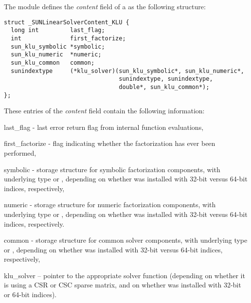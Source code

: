 The {\sunlinsolklu} module defines the \textit{content} field of a
 as the following structure:
\begin{verbatim}
struct _SUNLinearSolverContent_KLU {
  long int         last_flag;
  int              first_factorize;
  sun_klu_symbolic *symbolic;
  sun_klu_numeric  *numeric;
  sun_klu_common   common;
  sunindextype     (*klu_solver)(sun_klu_symbolic*, sun_klu_numeric*,
                                 sunindextype, sunindextype,
                                 double*, sun_klu_common*);
};
\end{verbatim}
These entries of the \emph{content} field contain the following
information:
\begin{args}
  \item[last\_flag] - last error return flag from internal function evaluations,
  \item[first\_factorize] - flag indicating whether the factorization
    has ever been performed,
  \item[symbolic] - {\klu} storage structure for symbolic
    factorization components, with underlying type 
    or , depending on whether {\sundials} was
    installed with 32-bit versus 64-bit indices, respectively,
  \item[numeric] - {\klu} storage structure for numeric factorization
    components, with underlying type  or
    , depending on whether {\sundials} was
    installed with 32-bit versus 64-bit indices, respectively.
  \item[common] - storage structure for common {\klu} solver
    components, with underlying type  or
    , depending on whether {\sundials} was
    installed with 32-bit versus 64-bit indices, respectively,
  \item[klu\_solver] -- pointer to the appropriate {\klu} solver function
    (depending on whether it is using a CSR or CSC sparse matrix, and
    on whether {\sundials} was installed with 32-bit or 64-bit indices).
\end{args}
